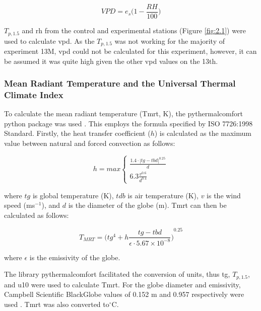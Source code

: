 \documentclass[final,3p,times,authoryear]{elsarticle}
\begin{document}
\begin{equation}
VPD=e_{s}\bigg( 1 - \frac{RH}{100} \bigg)
\label{eq:7.8}
\end{equation}

$T_{p,1.5}$ and \gls{rh} from the control and experimental stations (Figure \ref{fig:2.1}) were used to calculate \gls{vpd}. As the $T_{p,1.5}$ was not working for the majority of experiment 13M, \gls{vpd} could not be calculated for this experiment, however, it can be assumed it was quite high given the other \gls{vpd} values on the 13th.


\subsubsection{Mean Radiant Temperature and the Universal Thermal Climate Index}\label{sec:appendix7.4.4}

To calculate the mean radiant temperature (\gls{Tmrt}, K), the pythermalcomfort python package was used \citep{Tartarini2020}. This employs the formula specified by ISO 7726:1998 Standard. Firstly, the heat transfer coefficient ($h$) is calculated as the maximum value between natural and forced convection as follows:

\begin{equation}
h = max \begin{cases}  \frac{  1.4 \cdot |tg-tbd|^{0.25} }{d} \\  6.3 \frac{v^{0.6}}{d^{0.4}} \end{cases}
\label{eq:7.9}
\end{equation}

where $tg$ is global temperature (K), $tdb$ is air temperature (K), $v$ is the wind speed (ms$^{-1}$), and $d$ is the diameter of the globe (m). \gls{Tmrt} can then be calculated as follows:

\begin{equation}
T_{MRT}=  {  \bigg( tg^{4} + h \frac{tg - tbd}{\epsilon \cdot 5.67\times 10^{-8}} \bigg)}^{0.25}
\label{eq:7.10}
\end{equation}

where $\epsilon$ is the emissivity of the globe.

The library pythermalcomfort facilitated the conversion of units, thus \gls{tg}, $T_{p,1.5}$, and \gls{u10} were used to calculate \gls{Tmrt}. For the globe diameter and emissivity, Campbell Scientific BlackGlobe values of 0.152 m and 0.957 respectively were used \citep{CampbellScientific2022}. \gls{Tmrt} was also converted to$^{\circ}$C.
\end{document}
